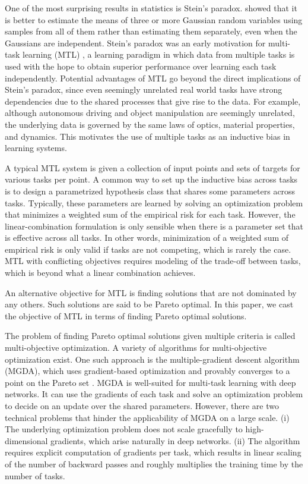 One of the most surprising results in statistics is Stein's paradox. \citet{Stein1956} showed that it is better
to estimate the means of three or more Gaussian random variables using samples from all of them rather than estimating them separately, even when the Gaussians are independent. Stein's paradox was an early motivation for multi-task learning (MTL) \citep{Caruana1997}, a learning paradigm in which data from multiple tasks is used with the hope to obtain superior performance over learning each task independently. Potential advantages of MTL go beyond the direct implications of Stein's paradox, since even seemingly unrelated real world tasks have strong dependencies due to the shared processes that give rise to the data. For example, although autonomous driving and object manipulation are seemingly unrelated, the underlying data is governed by the same laws of optics, material properties, and dynamics. This motivates the use of multiple tasks as an inductive bias in learning systems.

A typical MTL system is given a collection of input points and sets of targets for various tasks per point. A common way to set up the inductive bias across tasks is to design a parametrized hypothesis class that shares some parameters across tasks. Typically, these parameters are learned by solving an optimization problem that minimizes a weighted sum of the empirical risk for each task. However, the linear-combination formulation is only sensible when there is a parameter set that is effective across all tasks. In other words, minimization of a weighted sum of empirical risk is only valid if tasks are not competing, which is rarely the case. MTL with conflicting objectives requires modeling of the trade-off between tasks, which is beyond what a linear combination achieves.

An alternative objective for MTL is finding solutions that are not dominated by any others.
Such solutions are said to be Pareto optimal. In this paper, we cast the objective of MTL in terms of finding Pareto optimal solutions.

The problem of finding Pareto optimal solutions given multiple criteria is called multi-objective optimization. A variety of algorithms for multi-objective optimization exist. One such approach is the multiple-gradient descent algorithm (MGDA), which uses gradient-based optimization and provably converges to a point on the Pareto set \citep{Desideri2012}. MGDA is well-suited for multi-task learning with deep networks. It can use the gradients of each task and solve an optimization problem to decide on an update over the shared parameters. However, there are two technical problems that hinder the applicability of MGDA on a large scale. (i) The underlying optimization problem does not scale gracefully to high-dimensional gradients, which arise naturally in deep networks. (ii) The algorithm requires explicit computation of gradients per task, which results in linear scaling of the number of backward passes and roughly multiplies the training time by the number of tasks.

